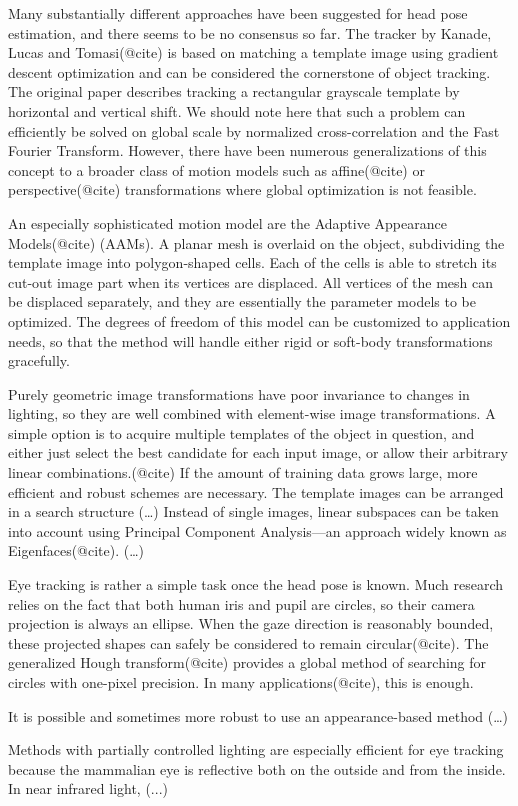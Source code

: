 Many substantially different approaches have been suggested for head pose estimation, and there seems to be no consensus so far.
The tracker by Kanade, Lucas and Tomasi(@cite) is based on matching a template image using gradient descent optimization and can be considered the cornerstone of object tracking.
The original paper describes tracking a rectangular grayscale template by horizontal and vertical shift.
We should note here that such a problem can efficiently be solved on global scale by normalized cross-correlation and the Fast Fourier Transform.
However, there have been numerous generalizations of this concept to a broader class of motion models such as affine(@cite) or perspective(@cite) transformations where global optimization is not feasible.

An especially sophisticated motion model are the Adaptive Appearance Models(@cite) (AAMs).
A planar mesh is overlaid on the object, subdividing the template image into polygon-shaped cells.
Each of the cells is able to stretch its cut-out image part when its vertices are displaced.
All vertices of the mesh can be displaced separately, and they are essentially the parameter models to be optimized.
The degrees of freedom of this model can be customized to application needs, so that the method will handle either rigid or soft-body transformations gracefully.

Purely geometric image transformations have poor invariance to changes in lighting, so they are well combined with element-wise image transformations.
A simple option is to acquire multiple templates of the object in question, and either just select the best candidate for each input image, or allow their arbitrary linear combinations.(@cite)
If the amount of training data grows large, more efficient and robust schemes are necessary.
The template images can be arranged in a search structure (\dots)
Instead of single images, linear subspaces can be taken into account using Principal Component Analysis---an approach widely known as Eigenfaces(@cite).
(\dots)

Eye tracking is rather a simple task once the head pose is known.
Much research relies on the fact that both human iris and pupil are circles, so their camera projection is always an ellipse.
When the gaze direction is reasonably bounded, these projected shapes can safely be considered to remain circular(@cite).
The generalized Hough transform(@cite) provides a global method of searching for circles with one-pixel precision.
In many applications(@cite), this is enough.

It is possible and sometimes more robust to use an appearance-based method (\dots)

Methods with partially controlled lighting are especially efficient for eye tracking because the mammalian eye is reflective both on the outside and from the inside.
In near infrared light, (...)
